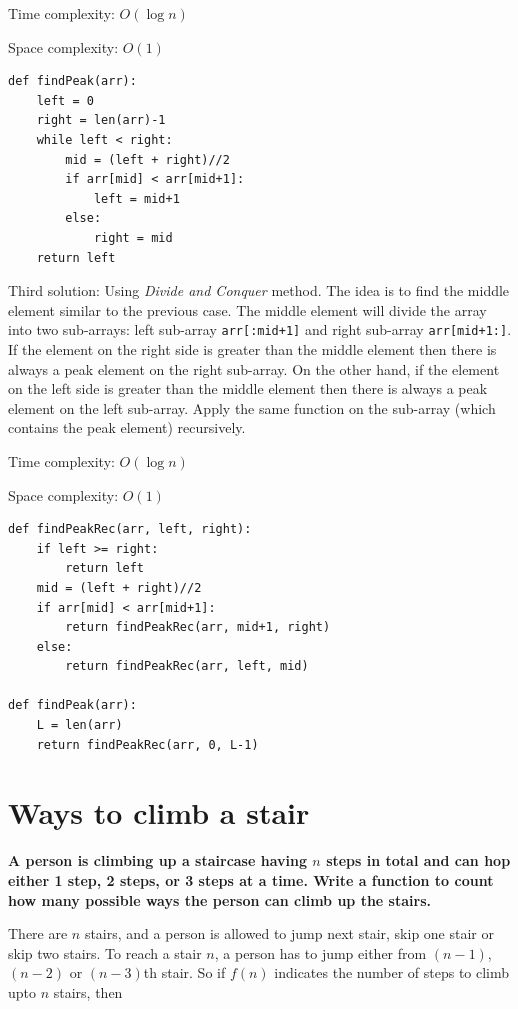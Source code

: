 \documentclass[a4paper,11pt]{book}
\begin{document}
\noindent Time complexity: $O(\log n)$

\noindent Space complexity: $O(1)$

\begin{lstlisting}
def findPeak(arr):
    left = 0
    right = len(arr)-1
    while left < right:
        mid = (left + right)//2
        if arr[mid] < arr[mid+1]:
            left = mid+1
        else:
            right = mid
    return left
\end{lstlisting}

\noindent Third solution: Using \textit{Divide and Conquer} method. The idea is to find the middle element similar to the previous case. The middle element will divide the array into two sub-arrays: left sub-array \lstinline{arr[:mid+1]} and right sub-array \lstinline{arr[mid+1:]}. If the element on the right side is greater than the middle element then there is always a peak element on the right sub-array. On the other hand, if the element on the left side is greater than the middle element then there is always a peak element on the left sub-array. Apply the same function on the sub-array (which contains the peak element) recursively.
\vspace{3mm}

\noindent Time complexity: $O(\log n)$

\noindent Space complexity: $O(1)$

\begin{lstlisting}
def findPeakRec(arr, left, right):
    if left >= right:
        return left
    mid = (left + right)//2
    if arr[mid] < arr[mid+1]:
        return findPeakRec(arr, mid+1, right)
    else:
        return findPeakRec(arr, left, mid)

def findPeak(arr):
    L = len(arr)
    return findPeakRec(arr, 0, L-1)
\end{lstlisting}

\newpage
\section{Ways to climb a stair}

\noindent \textbf{A person is climbing up a staircase having $n$ steps in total and can hop either 1 step, 2 steps, or 3 steps at a time. Write a function to count how many possible ways the person can climb up the stairs.}

\vspace{5mm}

\noindent There are $n$ stairs, and a person is allowed to jump next stair, skip one stair or skip two stairs. To reach a stair $n$, a person has to jump either from $(n-1)$, $(n-2)$ or $(n-3)$th stair. So if $f(n)$ indicates the number of steps to climb upto $n$ stairs, then
\end{document}
